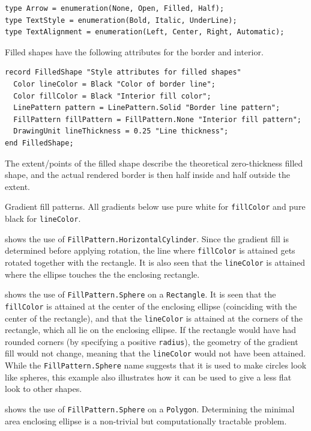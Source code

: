 \begin{lstlisting}[language=modelica]
type Arrow = enumeration(None, Open, Filled, Half);
type TextStyle = enumeration(Bold, Italic, UnderLine);
type TextAlignment = enumeration(Left, Center, Right, Automatic);
\end{lstlisting}%

Filled shapes have the following attributes for the border and interior.
\begin{lstlisting}[language=modelica]
record FilledShape "Style attributes for filled shapes"
  Color lineColor = Black "Color of border line";
  Color fillColor = Black "Interior fill color";
  LinePattern pattern = LinePattern.Solid "Border line pattern";
  FillPattern fillPattern = FillPattern.None "Interior fill pattern";
  DrawingUnit lineThickness = 0.25 "Line thickness";
end FilledShape;
\end{lstlisting}%
The extent/points of the filled shape describe the theoretical zero-thickness filled shape, and the actual rendered border is then half inside and half outside the extent.

\begin{example}
Gradient fill patterns.
All gradients below use pure white for \lstinline!fillColor! and pure black for \lstinline!lineColor!.

 shows the use of \lstinline!FillPattern.HorizontalCylinder!.
Since the gradient fill is determined before applying rotation, the line where \lstinline!fillColor! is attained gets rotated together with the rectangle.
It is also seen that the \lstinline!lineColor! is attained where the ellipse touches the the enclosing rectangle.

 shows the use of \lstinline!FillPattern.Sphere! on a \lstinline!Rectangle!.
It is seen that the \lstinline!fillColor! is attained at the center of the enclosing ellipse (coinciding with the center of the rectangle), and that the \lstinline!lineColor! is attained at the corners of the rectangle, which all lie on the enclosing ellipse.
If the rectangle would have had rounded corners (by specifying a positive \lstinline!radius!), the geometry of the gradient fill would not change, meaning that the \lstinline!lineColor! would not have been attained.
While the \lstinline!FillPattern.Sphere! name suggests that it is used to make circles look like spheres, this example also illustrates how it can be used to give a less flat look to other shapes.

 shows the use of \lstinline!FillPattern.Sphere! on a \lstinline!Polygon!.
Determining the minimal area enclosing ellipse is a non-trivial but computationally tractable problem.
\end{example}

